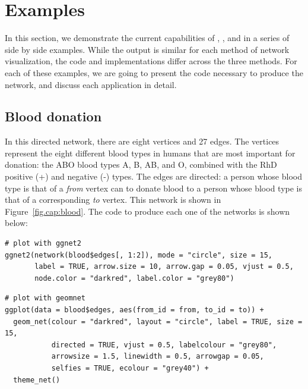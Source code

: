 \section{Examples}%
\label{sec:examples}
%


In this section, we demonstrate the current capabilities of , , and  in a series of side by side examples. While the output is similar for each method of network visualization, the code and implementations differ across the three methods.
For each of these examples, we are going to present the code necessary to produce the network, and discuss each application in detail.

\subsection{Blood donation}  %

In this directed network, there are eight vertices and 27 edges.  The vertices represent the eight different blood types in humans that are most important for donation: the ABO blood types A, B, AB, and O, combined with the RhD positive (+) and negative (-) types. The edges are directed: a person whose blood type is that of a \emph{from} vertex can to donate blood to a person whose blood type is that of a corresponding \emph{to} vertex.  This network is shown in Figure~\ref{fig.cap:blood}. The code to produce each one of the networks is shown below:



%
\begin{knitrout}
\color{fgcolor}\begin{kframe}
\begin{verbatim}
# plot with ggnet2
ggnet2(network(blood$edges[, 1:2]), mode = "circle", size = 15,
       label = TRUE, arrow.size = 10, arrow.gap = 0.05, vjust = 0.5,
       node.color = "darkred", label.color = "grey80")
\end{verbatim}
\end{kframe}
\end{knitrout}

\begin{knitrout}
\color{fgcolor}\begin{kframe}
\begin{verbatim}
# plot with geomnet
ggplot(data = blood$edges, aes(from_id = from, to_id = to)) +
  geom_net(colour = "darkred", layout = "circle", label = TRUE, size = 15,
           directed = TRUE, vjust = 0.5, labelcolour = "grey80",
           arrowsize = 1.5, linewidth = 0.5, arrowgap = 0.05,
           selfies = TRUE, ecolour = "grey40") +
  theme_net()
\end{verbatim}
\end{kframe}
\end{knitrout}

